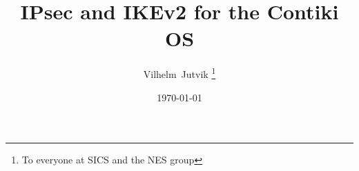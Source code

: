 \documentclass[final,a4paper,twoside,11pt,onecolumn]{report}
\begin{document}
% 
% 
% 
% 


\author{Vilhelm~Jutvik \thanks{To everyone at SICS and the NES group}}
\date{\today}
\title{IPsec and IKEv2 for the Contiki OS}
\end{document}
